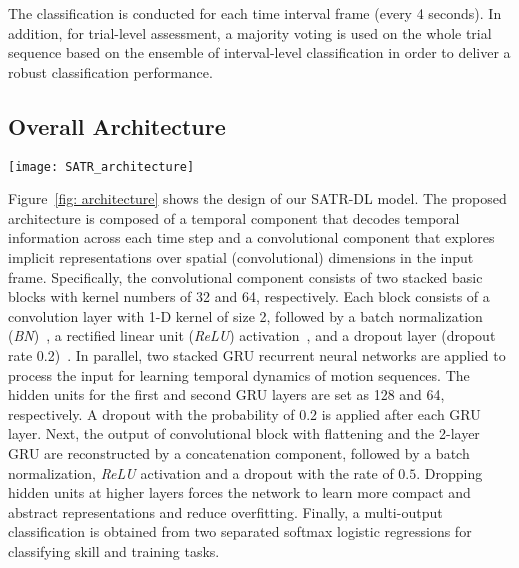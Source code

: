 \documentclass[letterpaper, 10 pt, conference, twoside]{IEEEtran}
\begin{document}
The classification is conducted for each time interval frame (every 4 seconds). In addition, for trial-level assessment, a majority voting is used on the whole trial sequence based on the ensemble of interval-level classification in order to deliver a robust classification performance. 



\subsection{Overall Architecture}

\begin{figure*}[tb]
      \centering
     \texttt{[image: SATR\_architecture]}
     \caption{ {\bf Proposed SATR-DL architecture with multi-output classifications.} The model utilizes convolutional and GRU recurrent neural networks via parallel computing to learn both spatial and temporal representations from low to high levels. 
		} 
      \label{fig: architecture} 
\vspace{-0.5cm}
\end{figure*}


Figure~\ref{fig: architecture} shows the design of our SATR-DL model. The proposed architecture is composed of a temporal component that decodes temporal information across each time step and a convolutional component that explores implicit representations over spatial (convolutional) dimensions in the input frame. 
Specifically, the convolutional component consists of two stacked basic blocks with kernel numbers of 32 and 64, respectively.
Each block consists of a convolution layer with 1-D kernel of size 2, followed by a batch normalization (\textit{BN})~\cite{ioffe2015batch}, a rectified linear unit (\textit{ReLU}) activation~\cite{nair2010relu}, and a dropout layer (dropout rate 0.2)~\cite{srivastava2014dropout}. 
In parallel, two stacked GRU recurrent neural networks are applied to process the input for learning temporal dynamics of motion sequences. The hidden units for the first and second GRU layers are set as 128 and 64, respectively. A dropout with the probability of 0.2 is applied after each GRU layer. Next, the output of convolutional block with flattening and the 2-layer GRU are reconstructed by a concatenation component, followed by a batch normalization, \textit{ReLU} activation and a dropout with the rate of $0.5$. Dropping hidden units at higher layers forces the network to learn more compact and abstract representations and reduce overfitting. Finally, a multi-output classification is obtained from two separated softmax logistic regressions for classifying skill and training tasks.
\end{document}
